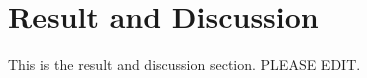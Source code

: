 \section{Result and Discussion}
\label{resultsanddiscussion}

This is the result and discussion section. PLEASE EDIT.